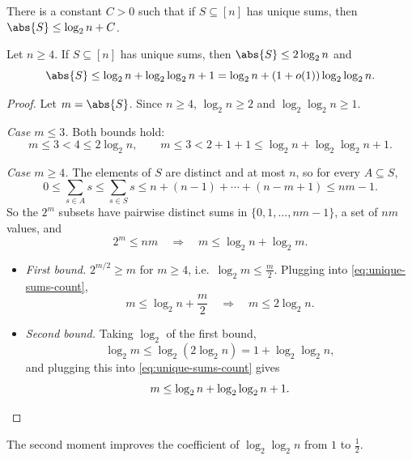 \begin{conjecture}[Erd\H{o}s]\label{conj:unique-sums}
    There is a constant \(C > 0\) such that if \(S \subseteq [n]\) has unique sums, then \(\abs{S} \le \log_2 n + C\).
\end{conjecture}

\begin{lemma}\label{lem:unique-sums-trivial}
    Let \(n \ge 4\). If \(S \subseteq [n]\) has unique sums, then \(\abs{S} \le 2\log_2 n\) and
    \[
        \abs{S} \le \log_2 n + \log_2 \log_2 n + 1 = \log_2 n + (1 + o(1)) \log_2 \log_2 n .
    \]
\end{lemma}

\begin{proof}
    Let \(m = \abs{S}\). Since \(n \ge 4\), \(\log_2 n \ge 2\) and \(\log_2\log_2 n \ge 1\).

    \emph{Case \(m \le 3\).} Both bounds hold:
    \[
        m \le 3 < 4 \le 2\log_2 n,
        \qquad
        m \le 3 < 2 + 1 + 1 \le \log_2 n + \log_2\log_2 n + 1 .
    \]

    \emph{Case \(m \ge 4\).} The elements of \(S\) are distinct and at most \(n\), so for every \(A \subseteq S\),
    \[
        0 \le \sum_{s \in A} s \le \sum_{s \in S} s \le n + (n-1) + \cdots + (n - m + 1) \le nm - 1 .
    \]
    So the \(2^{m}\) subsets have pairwise distinct sums in \(\{0, 1, \ldots, nm-1\}\), a set of \(nm\) values, and
    \begin{equation}\label{eq:unique-sums-count}
        2^{m} \le nm
        \quad\Longrightarrow\quad
        m \le \log_2 n + \log_2 m .
    \end{equation}
    \begin{itemize}
        \item \emph{First bound.} \(2^{m/2} \ge m\) for \(m \ge 4\), i.e.\ \(\log_2 m \le \frac{m}{2}\). Plugging into \eqref{eq:unique-sums-count},
        \[
            m \le \log_2 n + \frac{m}{2}
            \quad\Longrightarrow\quad
            m \le 2\log_2 n .
        \]
        \item \emph{Second bound.} Taking \(\log_2\) of the first bound,
        \[
            \log_2 m \le \log_2(2\log_2 n) = 1 + \log_2\log_2 n,
        \]
        and plugging this into \eqref{eq:unique-sums-count} gives
        \[
            m \le \log_2 n + \log_2\log_2 n + 1 . \qedhere
        \]
    \end{itemize}
\end{proof}

The second moment improves the coefficient of \(\log_2\log_2 n\) from \(1\) to \(\frac{1}{2}\).

